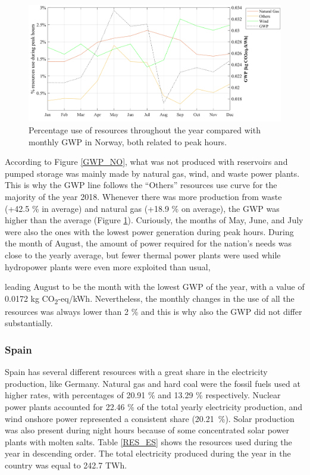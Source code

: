 {{\begin{figure}[htbp]
	\centering
	\includegraphics[width=1\textwidth]{ChapterLCA/Images/GWP_plots/Comp_GWP_NO.png}
	\caption{Percentage use of resources throughout the year compared with monthly GWP in Norway, both related to peak hours.}
	\label{COMP_NO}
\end{figure}

According to Figure \ref{GWP_NO}, what was not produced with reservoirs and pumped storage was mainly  made by natural gas, wind, and waste power plants. This is why the GWP line follows the ``Others'' resources use curve for the majority of the year 2018. Whenever there was more production from waste {(+42.5 \% in average)} and natural gas {(+18.9 \% on average)}, the GWP was higher than the average (Figure \ref{COMP_NO}). {Curiously, the months of May, June, and July were also the ones with the lowest power generation during peak hours.} During the month of August, the amount of power required for the nation's needs was close to the yearly average, but fewer thermal power plants were used while hydropower plants were even more exploited than usual, {leading August to be the month with the lowest GWP of the year, with a value of 0.0172 kg CO\textsubscript2-eq/kWh. %
 Nevertheless, the monthly changes in the use of all the resources was always lower than 2 \% and this is why also the GWP did not differ substantially. 

\subsubsection{Spain}

Spain has several different resources with a great share in the electricity production, like Germany.
 Natural gas and hard coal were the fossil fuels used at higher rates, with percentages of 20.91 \% and 13.29 \% respectively. Nuclear power plants accounted for 22.46 \% of the total yearly electricity production, and  wind onshore power represented a consistent share (20.21~\%).  Solar production was also present  during night hours because of some concentrated solar power plants with molten salts. Table \ref{RES_ES} shows the resources used during the year in descending order. The total electricity produced during the year in the country was equal to 242.7 TWh.

}}}
